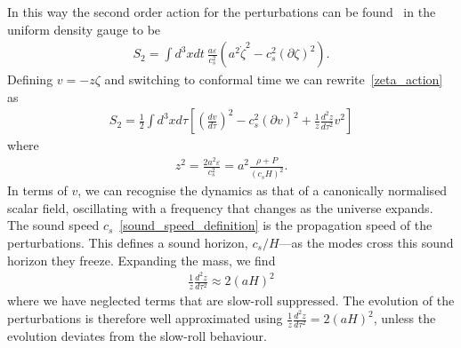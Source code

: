     In this way the second order action for the perturbations
    can be found~\cite{seery_ng_0506, Maldacena}
    in the uniform density gauge to be
    \begin{align}\label{zeta_action}
        S_{2} = \int d^3x dt~\frac{a\varepsilon}{c_s^2}\left(a^2\dot{\zeta}^2-c_s^2\left(\partial\zeta\right)^2\right).
    \end{align}
    Defining $v=-z\zeta$ and switching to conformal time we can rewrite~\eqref{zeta_action} as
    \begin{align}\label{v_action}
        S_{2} = \frac{1}{2}\int d^3x d\tau \left[{\left(\frac{d v}{d \tau}\right)}^2-c_s^2\left(\partial v\right)^2+\frac{1}{z}\frac{d^2z}{d\tau^2}v^2\right]
    \end{align}
    where
    \begin{align}\label{z_defn}
        z^2 = \frac{2a^2\varepsilon}{c_s^2} = a^2\frac{\rho+P}{\left(c_sH\right)^2}.
    \end{align}
    In terms of $v$, we can recognise the dynamics as that of a
    canonically normalised scalar field, oscillating
    with a frequency that changes as the universe expands.
    The sound speed $c_s$~\eqref{sound_speed_definition} is
    the propagation speed of the perturbations.
    This defines a sound horizon, $c_s/H$---as the modes cross this sound
    horizon they freeze.
    Expanding the mass, we find
    \begin{align}
        \frac{1}{z}\frac{d^2z}{d\tau^2} \approx 2{\left(aH\right)}^2
    \end{align}
    where we have neglected terms that are slow-roll suppressed.
    The evolution of the perturbations is therefore well approximated using
    $\frac{1}{z}\frac{d^2z}{d\tau^2} = 2{\left(aH\right)}^2$,
    unless the evolution deviates from the slow-roll behaviour.

